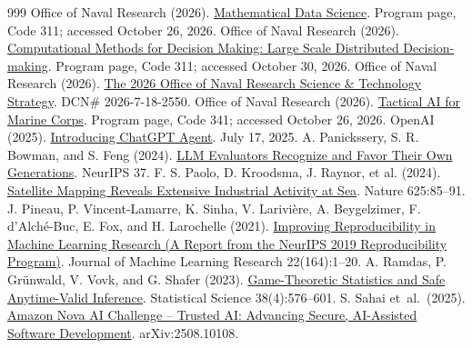 \documentclass[12pt,letterpaper]{article}
\begin{document}
\begin{thebibliography}{999}
 Office of Naval Research (2026). \href{https://www.onr.navy.mil/organization/departments/code-31/division-311/mathematical-data-science}{Mathematical Data Science}. Program page, Code 311; accessed October 26, 2026.
 Office of Naval Research (2026). \href{https://www.onr.navy.mil/organization/departments/code-31/division-311/computational-methods-decision-making-large-scale}{Computational Methods for Decision Making: Large Scale Distributed Decision-making}. Program page, Code 311; accessed October 30, 2026.
 Office of Naval Research (2026). \href{https://www.onr.navy.mil/media/document/office-naval-research-science-technology-strategy}{The 2026 Office of Naval Research Science \& Technology Strategy}. DCN\# 2026-7-18-2550.
 Office of Naval Research (2026). \href{https://www.onr.navy.mil/organization/departments/code-34/division-341/tactical-ai-marine-corps}{Tactical AI for Marine Corps}. Program page, Code 341; accessed October 26, 2026.
 OpenAI (2025). \href{https://openai.com/index/introducing-chatgpt-agent/}{Introducing ChatGPT Agent}. July 17, 2025.
 A. Panickssery, S. R. Bowman, and S. Feng (2024). \href{https://arxiv.org/abs/2404.13076}{LLM Evaluators Recognize and Favor Their Own Generations}. NeurIPS 37.
 F. S. Paolo, D. Kroodsma, J. Raynor, et al. (2024). \href{https://doi.org/10.1038/s41586-023-06825-8}{Satellite Mapping Reveals Extensive Industrial Activity at Sea}. Nature 625:85--91.
 J. Pineau, P. Vincent-Lamarre, K. Sinha, V. Larivi\`ere, A. Beygelzimer, F. d'Alch\'e-Buc, E. Fox, and H. Larochelle (2021). \href{https://www.jmlr.org/papers/v22/20-303.html}{Improving Reproducibility in Machine Learning Research (A Report from the NeurIPS 2019 Reproducibility Program)}. Journal of Machine Learning Research 22(164):1--20.
 A. Ramdas, P. Gr{\"u}nwald, V. Vovk, and G. Shafer (2023). \href{https://doi.org/10.1214/23-STS894}{Game-Theoretic Statistics and Safe Anytime-Valid Inference}. Statistical Science 38(4):576--601.
 S. Sahai et~al.\ (2025). \href{https://arxiv.org/abs/2508.10108}{Amazon Nova AI Challenge -- Trusted AI: Advancing Secure, AI-Assisted Software Development}. arXiv:2508.10108.

\end{thebibliography}
\end{document}
